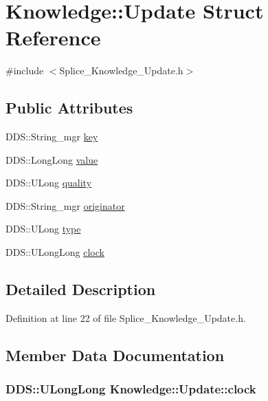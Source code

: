 \hypertarget{structKnowledge_1_1Update}{
\section{Knowledge::Update Struct Reference}
\label{df/ddf/structKnowledge_1_1Update}
}


{\ttfamily \#include $<$Splice\_\-Knowledge\_\-Update.h$>$}

\subsection*{Public Attributes}
\begin{DoxyCompactItemize}
\item 
DDS::String\_\-mgr \hyperlink{structKnowledge_1_1Update_a699402793204981538931d6c2eb1f8e4}{key}
\item 
DDS::LongLong \hyperlink{structKnowledge_1_1Update_a1890484966bfe55a5602fe6c1883a802}{value}
\item 
DDS::ULong \hyperlink{structKnowledge_1_1Update_acae49109e2f8977c025642710e04d080}{quality}
\item 
DDS::String\_\-mgr \hyperlink{structKnowledge_1_1Update_a885ad3fea98c3f1ab1e0a2d6f85c053c}{originator}
\item 
DDS::ULong \hyperlink{structKnowledge_1_1Update_a94b89c993c3748d01db522b124a16aa9}{type}
\item 
DDS::ULongLong \hyperlink{structKnowledge_1_1Update_a3301ea1692cac2598e9a81da20df6379}{clock}
\end{DoxyCompactItemize}


\subsection{Detailed Description}


Definition at line 22 of file Splice\_\-Knowledge\_\-Update.h.



\subsection{Member Data Documentation}
\hypertarget{structKnowledge_1_1Update_a3301ea1692cac2598e9a81da20df6379}{
\subsubsection[{clock}]{\setlength{\rightskip}{0pt plus 5cm}DDS::ULongLong {\bf Knowledge::Update::clock}}}
\label{df/ddf/structKnowledge_1_1Update_a3301ea1692cac2598e9a81da20df6379}


